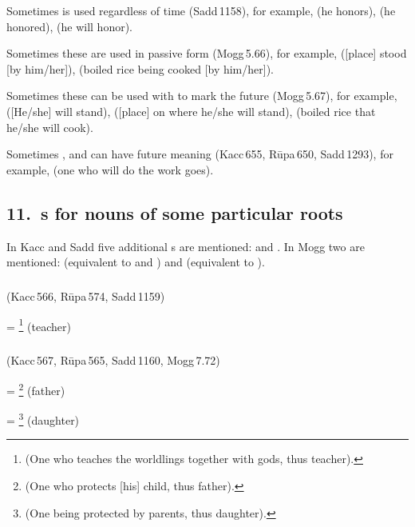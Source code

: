 Sometimes  is used regardless of time (Sadd\,1158), for example,  (he honors),  (he honored),  (he will honor).

Sometimes these are used in passive form (Mogg\,5.66), for example,  ([place] stood [by him/her]),  (boiled rice being cooked [by him/her]).

Sometimes these can be used with  to mark the future (Mogg\,5.67), for example,  ([He/she] will stand),  ([place] on where he/she will stand),  (boiled rice that he/she will cook).

Sometimes ,  and  can have future meaning (Kacc\,655, R\=upa\,650, Sadd\,1293), for example,  (one who will do the work goes).

\subsection*{11.\ s for nouns of some particular roots}\label{kita:group11}

In Kacc and Sadd five additional s are mentioned:  and . In Mogg two are mentioned:  (equivalent to  and ) and  (equivalent to ).

\subparagraph*{} (Kacc\,566, R\=upa\,574, Sadd\,1159)\label{pacck11:ratthu}

 = \footnote{ (One who teaches the worldlings together with gods, thus teacher).} (teacher)\par

\subparagraph*{} (Kacc\,567, R\=upa\,565, Sadd\,1160, Mogg\,7.72)\label{pacck11:ritu}\label{pacck11:tu1}

 = \footnote{ (One who protects [his] child, thus father).} (father)\par
{} = \footnote{ (One being protected by parents, thus daughter).} (daughter)\par

